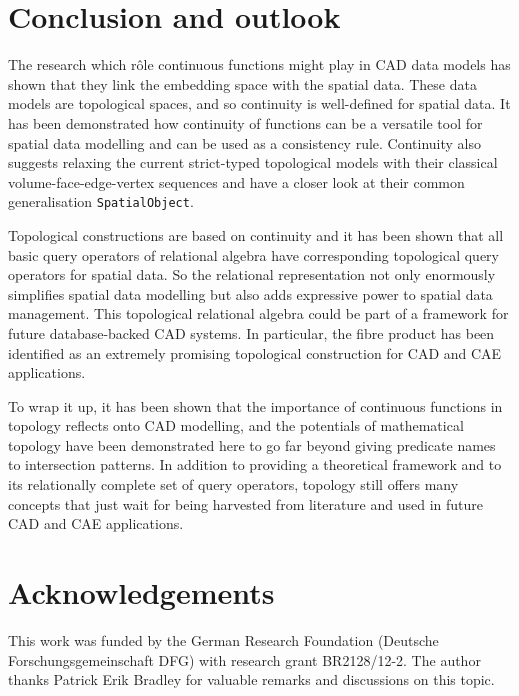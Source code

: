 \documentclass[5p]{elsarticle}
\begin{document}
\section{Conclusion and outlook}

The research which r\^ole continuous functions might play in CAD data models has 
shown that they link the embedding space with the spatial data. 
These data models are topological spaces, and so continuity is well-defined for spatial data. 
It has been demonstrated how continuity of functions can be a versatile tool for spatial 
data modelling and can be used as a consistency rule. 
Continuity also suggests relaxing the current strict-typed topological models with their 
classical volume-face-edge-vertex sequences and have a closer look at their common generalisation 
\texttt{SpatialObject}. 

Topological constructions are based on continuity and it has been shown that all basic query 
operators of relational algebra have corresponding topological query operators for spatial data. 
So the relational representation not only enormously simplifies spatial data modelling but 
also adds expressive power to spatial data management. 
This topological relational algebra could be part of a framework for future database-backed CAD 
systems. In particular, the fibre product has been identified as an extremely promising 
topological construction for CAD and CAE applications. 

To wrap it up, it has been shown that the importance of continuous functions in topology 
reflects onto CAD modelling, and the potentials of mathematical topology have been demonstrated 
here to go far beyond giving predicate names to intersection patterns. 
In addition to providing a theoretical framework and to its relationally complete set of 
query operators, topology still offers many concepts that just wait for being harvested 
from literature and used in future CAD and CAE applications. 


\section{Acknowledgements}

This work was funded by the German Research Foundation (Deutsche Forschungsgemeinschaft DFG) with 
research grant BR2128/12-2. The author thanks Patrick Erik Bradley for valuable remarks and 
discussions on this topic. 



\end{document}
